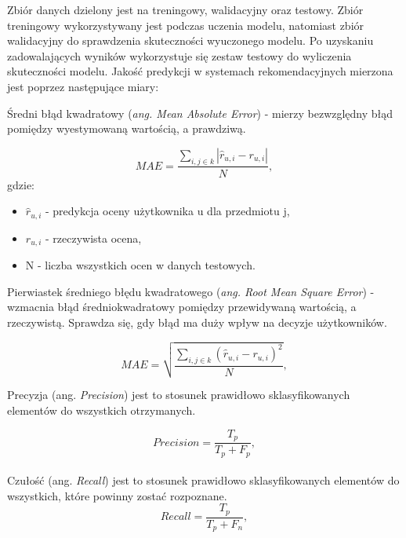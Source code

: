 Zbiór danych dzielony jest na treningowy, walidacyjny oraz testowy. Zbiór treningowy wykorzystywany jest podczas uczenia modelu, natomiast zbiór walidacyjny do sprawdzenia skuteczności wyuczonego modelu. Po uzyskaniu zadowalających wyników wykorzystuje się zestaw testowy do wyliczenia skuteczności modelu. Jakość predykcji w systemach rekomendacyjnych mierzona jest poprzez następujące miary:

Średni błąd kwadratowy (\textit{ang. Mean Absolute Error}) - mierzy bezwzględny błąd pomiędzy wyestymowaną wartością, a prawdziwą.

\begin{equation}
    MAE = \frac{\sum\limits_{i,j\in{k}}|\hat{r}_{u,i} - r_{u,i}|}{N},
\end{equation} gdzie:
\begin{itemize}
    \item $\hat{r}_{u,i}$ - predykcja oceny użytkownika u dla przedmiotu j,
    \item $r_{u,i}$ - rzeczywista ocena,
    \item N - liczba wszystkich ocen w danych testowych.
\end{itemize}

Pierwiastek średniego błędu kwadratowego (\textit{ang. Root Mean Square Error}) - wzmacnia błąd średniokwadratowy pomiędzy przewidywaną wartością, a rzeczywistą. Sprawdza się, gdy błąd ma duży wpływ na decyzje użytkowników.

\begin{equation}
    MAE = \sqrt{\frac{\sum\limits_{i,j\in{k}}(\hat{r}_{u,i} - r_{u,i})^2}{N}},
\end{equation}

Precyzja (ang. \textit{Precision}) jest to stosunek prawidłowo sklasyfikowanych elementów do wszystkich otrzymanych.

\begin{equation}
    Precision = \frac{T_p}{T_p + F_p},
\end{equation} \\
Czułość (ang. \textit{Recall}) jest to stosunek prawidłowo sklasyfikowanych elementów do wszystkich, które powinny zostać rozpoznane.
\begin{equation}
    Recall = \frac{T_p}{T_p + F_n},
\end{equation} \\

